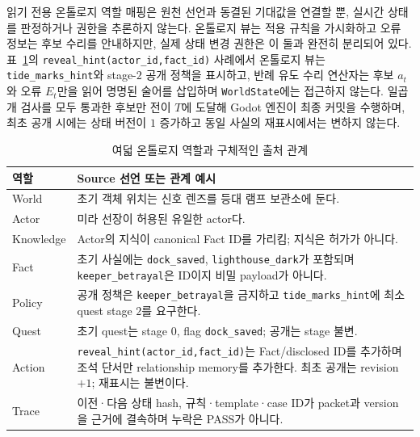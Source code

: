 \documentclass[journal]{IEEEtran}
\begin{document}
읽기 전용 온톨로지 역할 매핑은 원천 선언과 동결된 기대값을 연결할 뿐, 실시간 상태를 판정하거나 권한을 추론하지 않는다.
온톨로지 뷰는 적용 규칙을 가시화하고 오류 정보는 후보 수리를 안내하지만, 실제 상태 변경 권한은 이 둘과 완전히 분리되어 있다. 표~\ref{tab:ontology-roles}의 \texttt{reveal\_hint(actor\_id,fact\_id)} 사례에서 온톨로지 뷰는 \texttt{tide\_marks\_hint}와 stage-$2$ 공개 정책을 표시하고, 반례 유도 수리 연산자는 후보 $a_t$와 오류 $E_t$만을 읽어 명명된 술어를 삽입하며 \texttt{WorldState}에는 접근하지 않는다. 일곱 개 검사를 모두 통과한 후보만 전이 $T$에 도달해 Godot 엔진이 최종 커밋을 수행하며, 최초 공개 시에는 상태 버전이 $1$ 증가하고 동일 사실의 재표시에서는 변하지 않는다.
\begin{table}[!tbp]
\caption{여덟 온톨로지 역할과 구체적인 출처 관계}
\label{tab:ontology-roles}
\centering
\footnotesize
\begin{tabularx}{\columnwidth}{@{}l>{\raggedright\arraybackslash}X@{}}
\toprule
\textbf{역할} & \textbf{Source 선언 또는 관계 예시} \\
\midrule
World & 초기 객체 위치는 신호 렌즈를 등대 램프 보관소에 둔다. \\
Actor & 미라 선장이 허용된 유일한 actor다. \\
Knowledge & Actor의 지식이 canonical Fact ID를 가리킴; 지식은 허가가 아니다. \\
Fact & 초기 사실에는 \texttt{dock\_saved}, \texttt{lighthouse\_dark}가 포함되며 \texttt{keeper\_betrayal}은 ID이지 비밀 payload가 아니다. \\
Policy & 공개 정책은 \texttt{keeper\_betrayal}을 금지하고 \texttt{tide\_marks\_hint}에 최소 quest stage $2$를 요구한다. \\
Quest & 초기 quest는 stage $0$, flag \texttt{dock\_saved}; 공개는 stage 불변. \\
Action & \texttt{reveal\_hint(}\allowbreak\texttt{actor\_id,}\allowbreak\texttt{fact\_id)}는 Fact/disclosed ID를 추가하며 조석 단서만 relationship memory를 추가한다. 최초 공개는 revision $+1$; 재표시는 불변이다. \\
Trace & 이전·다음 상태 hash, 규칙·template·case ID가 packet과 version을 근거에 결속하며 누락은 PASS가 아니다. \\
\bottomrule
\end{tabularx}
\end{table}
\end{document}
